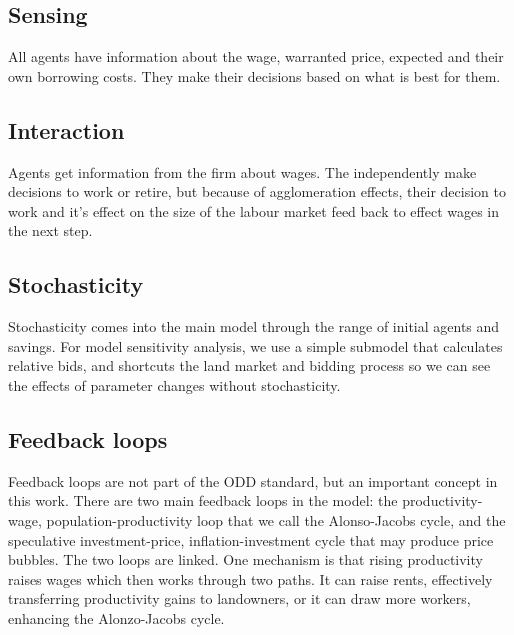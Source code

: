 \subsection{Sensing}
All agents have information about the wage, warranted price, expected and their own borrowing costs. They make their decisions based on what is best for them. 

\subsection{Interaction}
Agents get information from the firm about wages. The independently make decisions to work or retire, but because of agglomeration effects, their decision to work and it's effect on the size of the labour market feed back to effect wages in the next step. 

\subsection{Stochasticity}
Stochasticity comes into the main model through the range of initial agents and savings. For model sensitivity analysis, we use a simple submodel that calculates relative bids, and shortcuts the land market and bidding process so we can see the effects of parameter changes without stochasticity. 

\subsection{Feedback loops}
Feedback loops are not part of the ODD standard, but an important concept in this work. 
There are two main \glspl{feedback loop} in the model: the productivity-wage, population-productivity loop that we call the Alonso-Jacobs cycle, and the speculative investment-price, inflation-investment cycle that may produce price bubbles. 
The two loops are linked. One mechanism is that rising productivity raises wages which then works through two paths. It can raise rents, effectively transferring productivity gains to landowners, or it can draw more workers, enhancing the \Gls{Alonzo-Jacobs cycle}. 

